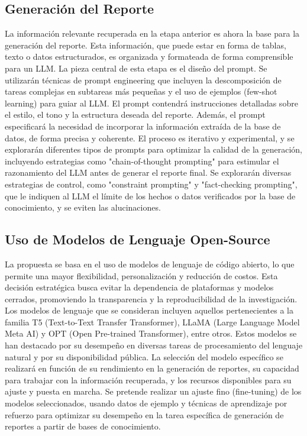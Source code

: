 \subsection{Generación del Reporte}

La información relevante recuperada en la etapa anterior es ahora la base para la generación del reporte. Esta información, que puede estar en forma de tablas, texto o datos estructurados, es organizada y formateada de forma comprensible para un LLM. La pieza central de esta etapa es el diseño del prompt. Se utilizarán técnicas de prompt engineering que incluyen la descomposición de tareas complejas en subtareas más pequeñas y el uso de ejemplos (few-shot learning) para guiar al LLM. El prompt contendrá instrucciones detalladas sobre el estilo, el tono y la estructura deseada del reporte. Además, el prompt especificará la necesidad de incorporar la información extraída de la base de datos, de forma precisa y coherente.
El proceso es iterativo y experimental, y se explorarán diferentes tipos de prompts para optimizar la calidad de la generación, incluyendo estrategias como "chain-of-thought prompting" para estimular el razonamiento del LLM antes de generar el reporte final. Se explorarán diversas estrategias de control, como "constraint prompting" y "fact-checking prompting", que le indiquen al LLM el límite de los hechos o datos verificados por la base de conocimiento, y se eviten las alucinaciones.

\subsection{Uso de Modelos de Lenguaje Open-Source}

La propuesta se basa en el uso de modelos de lenguaje de código abierto, lo que permite una mayor flexibilidad, personalización y reducción de costos. Esta decisión estratégica busca evitar la dependencia de plataformas y modelos cerrados, promoviendo la transparencia y la reproducibilidad de la investigación. Los modelos de lenguaje que se consideran incluyen aquellos pertenecientes a la familia T5 (Text-to-Text Transfer Transformer), LLaMA (Large Language Model Meta AI) y OPT (Open Pre-trained Transformer), entre otros. Estos modelos se han destacado por su desempeño en diversas tareas de procesamiento del lenguaje natural y por su disponibilidad pública.
La selección del modelo específico se realizará en función de su rendimiento en la generación de reportes, su capacidad para trabajar con la información recuperada, y los recursos disponibles para su ajuste y puesta en marcha. Se pretende realizar un ajuste fino (fine-tuning) de los modelos seleccionados, usando datos de ejemplo y técnicas de aprendizaje por refuerzo para optimizar su desempeño en la tarea específica de generación de reportes a partir de bases de conocimiento.

